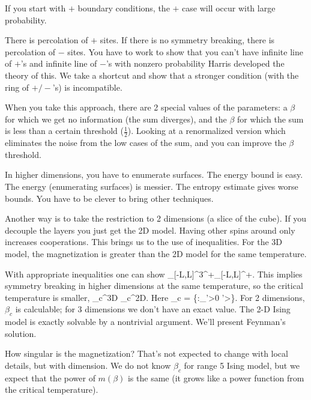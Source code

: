 \documentclass[12pt]{book}
\theoremstyle{norm}
\begin{document}
If you start with $+$ boundary conditions, the $+$ case will occur with large probability.

There is percolation of $+$ sites. If there is no symmetry breaking, there is percolation of $-$ sites. You have to work to show that you can't have infinite line of $+$'s and infinite line of $-$'s with nonzero probability  %
Harris developed the theory of this. We take a shortcut and show that a stronger condition (with the ring of $+/-$'s) is incompatible.

When you take this approach, there are 2 special values of the parameters: a $\beta$ for which we get no information (the sum diverges), and the $\beta$ for which the sum is less than a certain threshold ($\frac{1}{2}$). Looking at a renormalized version which eliminates the noise from the low cases of the sum, and you can improve the $\beta$ threshold.

In higher dimensions, you have to enumerate surfaces. The energy bound is easy. The energy (enumerating surfaces) is messier. The entropy estimate gives worse bounds. You have to be clever to bring other techniques.

Another way is to take the restriction to 2 dimensions (a slice of the cube). If you decouple the layers you just get the 2D model. Having other spins around only increases cooperations. 
This brings us to the use of inequalities. For the 3D model, the magnetization is greater than the 2D model for the same temperature. 

With appropriate inequalities one can show
\be
\left{}\right\rangle_{[-L,L]^3}^+\ge \left{}\right\rangle_{[-L,L]}^+.
\ee
This implies symmetry breaking in higher dimensions at the same temperature, so the critical temperature is smaller,
\be
\beta_{c}^{3D} \le \beta_c^{2D}.
\ee
Here
\be
\beta_c = \inf \left\{{\beta}:{\left{}\right\rangle_{\beta'}>0 \forall \beta'>\beta}\right\}.
\ee
For 2 dimensions, $\beta_c$ is calculable; for 3 dimensions we don't have an exact value. The 2-D Ising model is exactly solvable by a nontrivial argument. We'll present Feynman's solution.

How singular is the magnetization? That's not expected to change with local details, but with dimension. We do not know $\beta_c$ for range 5 Ising model, but we expect that the power of $m(\beta)$ is the same (it grows like a power function from the critical temperature).
\end{document}
